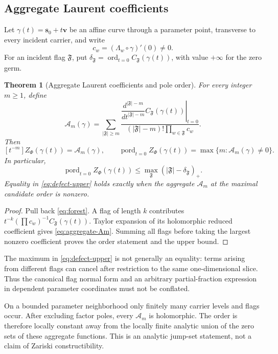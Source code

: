 \documentclass[11pt]{article}
\newtheorem{theorem}{Theorem}[section]
\begin{document}
\subsection{Aggregate Laurent coefficients}

Let \(\gamma(t)=\mathbf s_0+t\mathbf v\) be an affine curve through a
parameter point, transverse to every incident carrier, and write
\[
 c_w=(\Lambda_w\circ\gamma)'(0)\ne0.
\]
For an incident flag \(\mathfrak F\), put
\(\delta_{\mathfrak F}=\operatorname{ord}_{t=0}
 C_{\mathfrak F}(\gamma(t))\), with value \(+\infty\) for the zero germ.

\begin{theorem}[Aggregate Laurent coefficients and pole order]
\label{thm:aggregate-order}
For every integer \(m\ge1\), define
\begin{equation}\label{eq:aggregate-Am}
 \mathcal A_m(\gamma)=
 \sum_{|\mathfrak F|\ge m}
 \frac{
  \left.\dfrac{d^{|\mathfrak F|-m}}{dt^{|\mathfrak F|-m}}
  C_{\mathfrak F}(\gamma(t))\right|_{t=0}}
 {(|\mathfrak F|-m)!\prod_{w\in\mathfrak F}c_w}.
\end{equation}
Then
\[
 [t^{-m}]Z_\Phi(\gamma(t))=\mathcal A_m(\gamma),
 \qquad
 \operatorname{pord}_{t=0}Z_\Phi(\gamma(t))
 =\max\{m:\mathcal A_m(\gamma)\ne0\}.
\]
In particular,
\begin{equation}\label{eq:defect-upper}
 \operatorname{pord}_{t=0}Z_\Phi(\gamma(t))
 \le
 \max_{\mathfrak F}
 (|\mathfrak F|-\delta_{\mathfrak F})_+.
\end{equation}
Equality in \eqref{eq:defect-upper} holds exactly when the aggregate
\(\mathcal A_m\) at the maximal candidate order is nonzero.
\end{theorem}

\begin{proof}
Pull back \eqref{eq:forest}.  A flag of length \(k\) contributes
\(t^{-k}(\prod c_w)^{-1}C_{\mathfrak F}(\gamma(t))\).  Taylor expansion
of its holomorphic reduced coefficient gives
\eqref{eq:aggregate-Am}.  Summing all flags before taking the largest
nonzero coefficient proves the order statement and the upper bound.
\end{proof}

The maximum in \eqref{eq:defect-upper} is not generally an equality:
terms arising from different flags can cancel after restriction to the
same one-dimensional slice.  Thus the canonical flag normal form and an
arbitrary partial-fraction expression in dependent parameter
coordinates must not be conflated.

On a bounded parameter neighborhood only finitely many carrier levels
and flags occur.  After excluding factor poles, every
\(\mathcal A_m\) is holomorphic.  The order is therefore locally
constant away from the locally finite analytic union of the zero sets
of these aggregate functions.  This is an analytic jump-set statement,
not a claim of Zariski constructibility.
\end{document}

